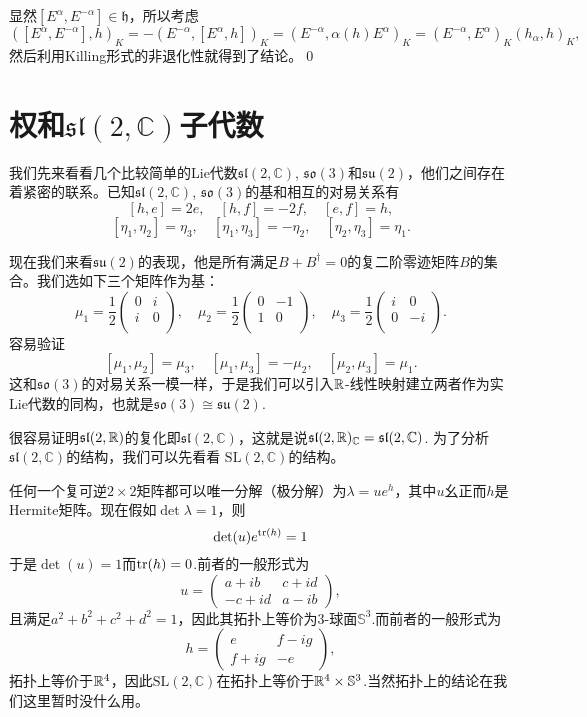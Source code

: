 \documentclass[9pt]{extarticle}
\newcommand{\cc}{\mathbb{C}}
\begin{document}
\proof 显然$[E^\alpha,E^{-\alpha}]\in \mathfrak{h}$，所以考虑
\[
	([E^\alpha,E^{-\alpha}],h)_K=-(E^{-\alpha},[E^\alpha,h])_K=(E^{-\alpha},\alpha(h)E^\alpha)_K=(E^{-\alpha},E^\alpha)_K(h_\alpha,h)_K,
\]
然后利用Killing形式的非退化性就得到了结论。\qed

\section{权和$\mathfrak{sl}(2,\cc)$子代数}

我们先来看看几个比较简单的Lie代数$\mathfrak{sl}(2,\cc)$, $\mathfrak{so}(3)$和$\mathfrak{su}(2)$，他们之间存在着紧密的联系。已知$\mathfrak{sl}(2,\cc)$, $\mathfrak{so}(3)$的基和相互的对易关系有
\[
[h,e]=2e,\quad[h,f]=-2f,\quad[e,f]=h,
\]
\[
	[\eta_1,\eta_2]=\eta_3,\quad [\eta_1,\eta_3]=-\eta_2,\quad [\eta_2,\eta_3]=\eta_1.
\]

现在我们来看$\mathfrak{su}(2)$的表现，他是所有满足$B+B^\dag=0$的复二阶零迹矩阵$B$的集合。我们选如下三个矩阵作为基：
\[
\mu_1=\frac{1}{2}\begin{pmatrix}
	0&i\\
	i&0\\
\end{pmatrix},\quad
\mu_2=\frac{1}{2}\begin{pmatrix}
	0&-1\\
	1&0\\
\end{pmatrix},\quad
\mu_3=\frac{1}{2}\begin{pmatrix}
	i&0\\
	0&-i\\
\end{pmatrix}.
\]
容易验证
\[
	[\mu_1,\mu_2]=\mu_3,\quad [\mu_1,\mu_3]=-\mu_2,\quad [\mu_2,\mu_3]=\mu_1.
\]
这和$\mathfrak{so}(3)$的对易关系一模一样，于是我们可以引入$\mathbb{R}$-线性映射建立两者作为实Lie代数的同构，也就是$\mathfrak{so}(3)\cong \mathfrak{su}(2)$.

很容易证明$\mathfrak{sl}(2,\mathbb{R})$的复化即$\mathfrak{sl}(2,\cc)$，这就是说$\mathfrak{sl}(2,\rr)_\cc=\mathfrak{sl}(2,\cc)$. 为了分析$\mathfrak{sl}(2,\cc)$的结构，我们可以先看看
$\mathrm{SL}(2,\mathbb{C})$的结构。

任何一个复可逆$2\times 2$矩阵都可以唯一分解（极分解）为$
\lambda=ue^{h}$，其中$u$幺正而$h$是Hermite矩阵。现在假如$\det \lambda=1$，则
\[
\det(u)e^{\operatorname{tr}(h)}=1
\]
于是$\det(u)=1$而$\operatorname{tr}(h)=0$.前者的一般形式为
\[
u=
\begin{pmatrix}
a+ib&c+id\\
-c+id&a-ib
\end{pmatrix},
\]
且满足$a^2+b^2+c^2+d^2=1$，因此其拓扑上等价为3-球面$\mathbb{S}^3$.而前者的一般形式为
\[
h=\begin{pmatrix}
e&f-ig\\
f+ig&-e
\end{pmatrix},
\]
拓扑上等价于$\mathbb{R}^4$，因此$\mathrm{SL}(2,\cc)$在拓扑上等价于$\mathbb{R}^4\times \mathbb{S}^3$.当然拓扑上的结论在我们这里暂时没什么用。
\end{document}
